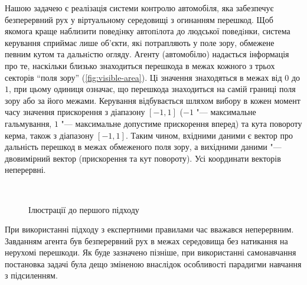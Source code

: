 \documentclass[a4paper,12pt]{article}
\begin{document}
Нашою задачею є реалізація системи контролю автомобіля, яка забезпечує безперервний рух у віртуальному середовищі з огинанням перешкод. Щоб якомога краще наблизити поведiнку автопiлота до людської поведiнки, система керування сприймає лише об’єкти, якi потрапляють у поле зору, обмежене певним кутом та дальнiстю огляду. Агенту (автомобілю) надається інформація про те, наскільки близько знаходиться перешкода в межах кожного з трьох секторів ``поля зору'' (\ref{fig:visible-area}). Ці значення знаходяться в межах від $0$ до $1$, при цьому одиниця означає, що перешкода знаходиться на самій границі поля зору або за його межами. Керування відбувається шляхом вибору в кожен момент часу значення прискорення з діапазону $[-1,1]$ ($-1$ "--- максимальне гальмування, $1$ "--- максимальне допустиме прискорення вперед) та кута повороту керма, також з діапазону $[-1,1]$. Таким чином, вхідними даними є вектор про дальність перешкод в межах обмеженого поля зору, а вихідними даними "--- двовимірний вектор (прискорення та кут повороту). Усі координати векторів неперервні. 
\begin{figure}
  \centering
  \,
  \caption{Ілюстрації до першого підходу}
  \label{fig:car-related}
\end{figure}

При використанні підходу з експертними правилами час вважався неперервним. Завданням агента був безперервний рух в межах середовища без натикання на нерухомі перешкоди. Як буде зазначено пізніше, при використанні самонавчання постановка задачі була дещо зміненою внаслідок особливості парадигми навчання з підсиленням.
\end{document}
